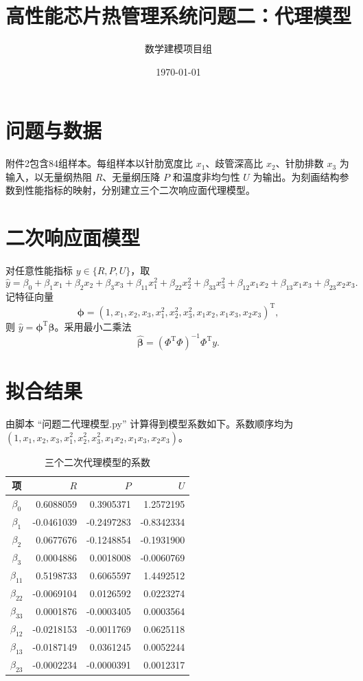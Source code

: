 \documentclass[UTF8,a4paper,12pt]{ctexart}
\title{高性能芯片热管理系统问题二：代理模型}
\author{数学建模项目组}\date{\today}
\begin{document}
\maketitle

\section{问题与数据}
附件2包含84组样本。每组样本以针肋宽度比 $x_1$、歧管深高比 $x_2$、针肋排数 $x_3$ 为输入，以无量纲热阻 $R$、无量纲压降 $P$ 和温度非均匀性 $U$ 为输出。为刻画结构参数到性能指标的映射，分别建立三个二次响应面代理模型。

\section{二次响应面模型}
对任意性能指标 $y\in\{R,P,U\}$，取
\begin{equation}
\hat y=\beta_0+\beta_1x_1+\beta_2x_2+\beta_3x_3+\beta_{11}x_1^2+\beta_{22}x_2^2+\beta_{33}x_3^2+\beta_{12}x_1x_2+\beta_{13}x_1x_3+\beta_{23}x_2x_3.
\end{equation}
记特征向量
\[
\boldsymbol\phi=(1,x_1,x_2,x_3,x_1^2,x_2^2,x_3^2,x_1x_2,x_1x_3,x_2x_3)^\mathrm T,
\]
则 $\hat y=\boldsymbol\phi^\mathrm T\boldsymbol\beta$。采用最小二乘法
\begin{equation}
\hat{\boldsymbol\beta}=(\Phi^\mathrm T\Phi)^{-1}\Phi^\mathrm Ty.
\end{equation}

\section{拟合结果}
由脚本 ``问题二代理模型.py'' 计算得到模型系数如下。系数顺序均为 $(1,x_1,x_2,x_3,x_1^2,x_2^2,x_3^2,x_1x_2,x_1x_3,x_2x_3)$。

\begin{table}[h]
\centering\caption{三个二次代理模型的系数}
\small
\begin{tabular}{c|rrr}
\toprule
项 & $R$ & $P$ & $U$\\\midrule
$\beta_0$&0.6088059&0.3905371&1.2572195\\
$\beta_1$&-0.0461039&-0.2497283&-0.8342334\\
$\beta_2$&0.0677676&-0.1248854&-0.1931900\\
$\beta_3$&0.0004886&0.0018008&-0.0060769\\
$\beta_{11}$&0.5198733&0.6065597&1.4492512\\
$\beta_{22}$&-0.0069104&0.0126592&0.0223274\\
$\beta_{33}$&0.0001876&-0.0003405&0.0003564\\
$\beta_{12}$&-0.0218153&-0.0011769&0.0625118\\
$\beta_{13}$&-0.0187149&0.0361245&0.0052244\\
$\beta_{23}$&-0.0002234&-0.0000391&0.0012317\\
\bottomrule
\end{tabular}
\end{table}
\end{document}
